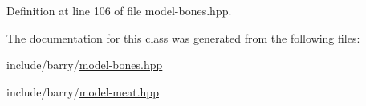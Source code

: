 Definition at line 106 of file model-\/bones.\+hpp.



The documentation for this class was generated from the following files\+:\begin{DoxyCompactItemize}
\item 
include/barry/\hyperlink{model-bones_8hpp}{model-\/bones.\+hpp}\item 
include/barry/\hyperlink{model-meat_8hpp}{model-\/meat.\+hpp}\end{DoxyCompactItemize}
